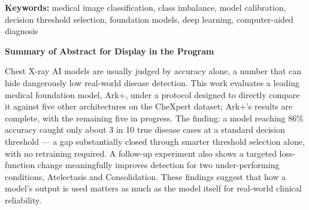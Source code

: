 \documentclass[11pt]{article}
\begin{document}
\vspace{1.5em}
\noindent\textbf{Keywords:} medical image classification, class imbalance, model calibration, decision threshold selection, foundation models, deep learning, computer-aided diagnosis

\vspace{1.5em}
\begin{center}
{\large\bfseries Summary of Abstract for Display in the Program}\\[2pt]
\end{center}

\vspace{1em}
\noindent
Chest X-ray AI models are usually judged by accuracy alone, a number that can hide dangerously low real-world disease detection. This work evaluates a leading medical foundation model, Ark+, under a protocol designed to directly compare it against five other architectures on the CheXpert dataset; Ark+'s results are complete, with the remaining five in progress. The finding: a model reaching 86\% accuracy caught only about 3 in 10 true disease cases at a standard decision threshold --- a gap substantially closed through smarter threshold selection alone, with no retraining required. A follow-up experiment also shows a targeted loss-function change meaningfully improves detection for two under-performing conditions, Atelectasis and Consolidation. These findings suggest that how a model's output is used matters as much as the model itself for real-world clinical reliability.
\end{document}
